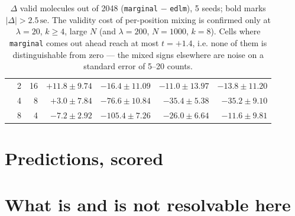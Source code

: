 \documentclass[11pt]{article}
\begin{document}
\begin{table}[htbp]
{\begin{tabular}{rrrrrrr}
 & 2 & 16 & $+11.8 \pm 9.74$ & $-16.4 \pm 11.09$ & $-11.0 \pm 13.97$ & $-13.8 \pm 11.20$ \\
 & 4 & 8 & $+3.0 \pm 7.84$ & \textbf{$-76.6 \pm 10.84$} & \textbf{$-35.4 \pm 5.38$} & \textbf{$-35.2 \pm 9.10$} \\
 & 8 & 4 & $-7.2 \pm 2.92$ & \textbf{$-105.4 \pm 7.26$} & \textbf{$-26.0 \pm 6.64$} & $-11.6 \pm 9.81$ \\
\bottomrule
\end{tabular}}
\caption{$\Delta$ valid molecules out of 2048 (\texttt{marginal} $-$ \texttt{edlm}), 5 seeds; bold marks $|\Delta| > 2.5\,\mathrm{se}$. The validity cost of per-position mixing is confirmed only at $\lambda=20$, $k\ge4$, large $N$ (and $\lambda=200$, $N=1000$, $k=8$). Cells where \texttt{marginal} comes out ahead reach at most $t=+1.4$, i.e. none of them is distinguishable from zero --- the mixed signs elsewhere are noise on a standard error of 5--20 counts.}
\label{tab:fs-delta-valid}
\end{table}


\section{Predictions, scored}

\begin{table}[htbp]
\centering
\small
{}
\caption{Written down before the sweep was read.}
\label{tab:fs-predictions}
\end{table}


\section{What is and is not resolvable here}
\end{document}
